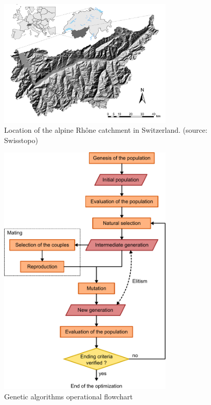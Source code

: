 \documentclass[twocol]{ametsoc}
\begin{document}
\begin{figure}[htb]
	\centerline{\includegraphics[width=8.3cm]{figures/figure_map.pdf}}
	\caption{Location of the alpine Rhône catchment in Switzerland. (source: Swisstopo)}
	\label{fig:map}
\end{figure}


\begin{figure}[htb]
	\centerline{\includegraphics[width=8.3cm]{figures/figure_structure_gas.pdf}}
	\caption{Genetic algorithms operational flowchart}
	\label{fig:structure_gas}
\end{figure}
\end{document}
